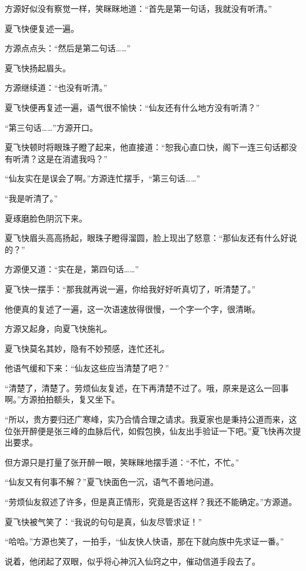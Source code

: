 
\begin{this_body}

方源好似没有察觉一样，笑眯眯地道：“首先是第一句话，我就没有听清。”

夏飞快便复述一遍。

方源点点头：“然后是第二句话……”

夏飞快扬起眉头。

方源继续道：“也没有听清。”

夏飞快便再复述一遍，语气很不愉快：“仙友还有什么地方没有听清？”

“第三句话……”方源开口。

夏飞快顿时将眼珠子瞪了起来，他直接道：“恕我心直口快，阁下一连三句话都没有听清？这是在消遣我吗？”

“仙友实在是误会了啊。”方源连忙摆手，“第三句话……”

“我是听清了。”

夏琢磨脸色阴沉下来。

夏飞快眉头高高扬起，眼珠子瞪得溜圆，脸上现出了怒意：“那仙友还有什么好说的？”

方源便又道：“实在是，第四句话……”

夏飞快一摆手：“那我就再说一遍，你给我好好听真切了，听清楚了。”

他便真的复述了一遍，这一次语速放得很慢，一个字一个字，很清晰。

方源又起身，向夏飞快施礼。

夏飞快莫名其妙，隐有不妙预感，连忙还礼。

他语气缓和下来：“仙友这些应当清楚了吧？”

“清楚了，清楚了。劳烦仙友复述，在下再清楚不过了。哦，原来是这么一回事啊。”方源拍拍额头，复又坐下。

“所以，贵方要归还广寒峰，实乃合情合理之请求。我夏家也是秉持公道而来，这位张开醉便是张三峰的血脉后代，如假包换，仙友出手验证一下吧。”夏飞快再次提出要求。

但方源只是打量了张开醉一眼，笑眯眯地摆手道：“不忙，不忙。”

“仙友又有何事不解？”夏飞快面色一沉，语气不善地问道。

“劳烦仙友叙述了许多，但是真正情形，究竟是否这样？我还不能确定。”方源道。

夏飞快被气笑了：“我说的句句是真，仙友尽管求证！”

“哈哈。”方源也笑了，一拍手，“仙友快人快语，那在下就向族中先求证一番。”

说着，他闭起了双眼，似乎将心神沉入仙窍之中，催动信道手段去了。


\end{this_body}
